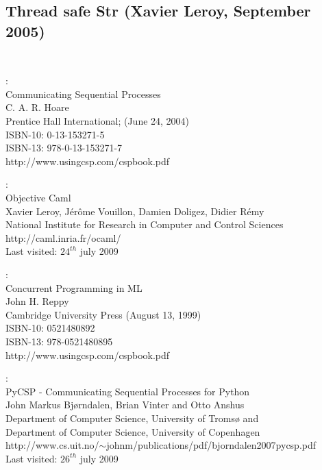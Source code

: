\documentclass[a4paper,12pt]{article}
\begin{document}
\newpage
\subsection{Thread safe Str (Xavier Leroy, September 2005)}
\label{appendixThreadsafestr}
{\tt
  \scriptsize
  
  \normalsize
}


\newpage
\begin{thebibliography}{99}

:\\
Communicating Sequential Processes\\
C. A. R. Hoare\\
Prentice Hall International; (June 24, 2004)\\
ISBN-10: 0-13-153271-5\\
ISBN-13: 978-0-13-153271-7\\
http://www.usingcsp.com/cspbook.pdf

:\\
Objective Caml\\
Xavier Leroy, Jérôme Vouillon, Damien Doligez, Didier Rémy\\
National Institute for Research in Computer and Control Sciences\\
http://caml.inria.fr/ocaml/\\
Last visited: $24^{th}$ july 2009

:\\
Concurrent Programming in ML\\
John H. Reppy\\
Cambridge University Press (August 13, 1999)\\
ISBN-10: 0521480892\\
ISBN-13: 978-0521480895\\
http://www.usingcsp.com/cspbook.pdf

:\\
PyCSP - Communicating Sequential Processes for Python\\
John Markus Bjørndalen, Brian Vinter and Otto Anshus\\
Department of Computer Science, University of Tromsø and\\
Department of Computer Science, University of Copenhagen\\
http://www.cs.uit.no/$\sim$johnm/publications/pdf/bjorndalen2007pycsp.pdf\\
Last visited: $26^{th}$ july 2009


\end{thebibliography}
\end{document}
